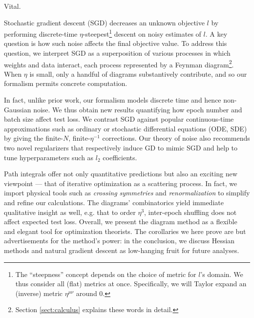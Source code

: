 \documentclass{article}
\begin{document}
        Vital.


        Stochastic gradient descent (SGD) decreases an unknown objective $l$ by
        performing discrete-time $\eta$-steepest\footnote{
            The ``steepness'' concept depends on the choice of metric for
            $l$'s domain.  We thus consider all (flat) metrics at once.
            Specifically, we will Taylor expand an (inverse) metric
            $\eta^{\mu\nu}$ around $0$.
        } descent on noisy estimates of $l$.
        A key question is how such noise affects the final objective value.  To
        address this question, we interpret SGD as a superposition of various
        processes in which weights and data interact, each process represented
        by a Feynman diagram\footnote{
            Section \ref{sect:calculus} explains these words in detail.
        }.  When $\eta$ is small, only a handful of diagrams
        substantively contribute, and so our formalism permits concrete
        computation.


        In fact, unlike prior work, our formalism models discrete time and
        hence non-Gaussian noise.  We thus obtain new results quantifying how
        epoch number and batch size affect test loss.  We contrast SGD against
        popular continuous-time approximations such as ordinary or stochastic
        differential equations (ODE, SDE) by giving the finite-$N$,
        finite-$\eta^{-1}$ corrections.  Our theory of noise also recommends
        two novel regularizers that respectively induce GD to mimic SGD and
        help to tune hyperparameters such as $l_2$ coefficients. 


        Path integrals offer not only quantitative predictions but also an
        exciting new viewpoint --- that of iterative optimization as a
        scattering process.  In fact, we import physical tools such as
        \emph{crossing symmetries} \citep{dy49b} and \emph{renormalization}
        \citep{ge54} to simplify and refine our calculations.  The diagrams'
        combinatorics yield immediate qualitative insight as well, e.g. that to
        order $\eta^3$, inter-epoch shuffling does not affect expected test
        loss.  Overall, we present the diagram method as a flexible and elegant
        tool for optimization theorists.  The corollaries we here prove are
        but advertisements for the method's power: in the conclusion, we
        discuss Hessian methods and natural gradient descent as low-hanging
        fruit for future analyses.
\end{document}
